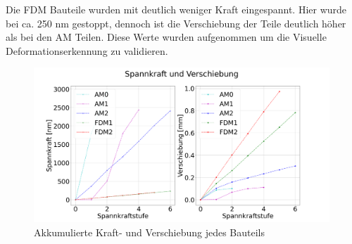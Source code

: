 Die FDM Bauteile wurden mit deutlich weniger Kraft eingespannt. Hier wurde bei ca. 
250 nm gestoppt, dennoch ist die Verschiebung der Teile deutlich höher als bei den 
AM Teilen. Diese Werte wurden aufgenommen um die Visuelle Deformationserkennung zu 
validieren.

\begin{figure}[H]
    \centering
    \includegraphics[width=0.99\textwidth]{images/spannkraftstufen_akkumuliert.png}
    \caption{Akkumulierte Kraft- und Verschiebung jedes Bauteils}
    \label{fig:akkumulated}
\end{figure}

